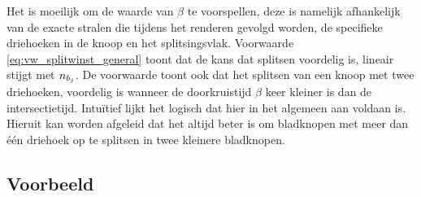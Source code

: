 Het is moeilijk om de waarde van $\beta$ te voorspellen, deze is namelijk afhankelijk van de exacte stralen die tijdens het renderen gevolgd worden, de specifieke driehoeken in de knoop en het splitsingsvlak. 
Voorwaarde \ref{eq:vw_splitwinst_general} toont dat de kans dat splitsen voordelig is, lineair stijgt met $n_{b_j}$. 
De voorwaarde toont ook dat het splitsen van een knoop met twee driehoeken, voordelig is wanneer de doorkruistijd $\beta$ keer kleiner is dan de intersectietijd. 
Intuïtief lijkt het logisch dat hier in het algemeen aan voldaan is. 
Hieruit kan worden afgeleid dat het altijd beter is om bladknopen met meer dan één driehoek op te splitsen in twee kleinere bladknopen.\\

\subsection{Voorbeeld}
